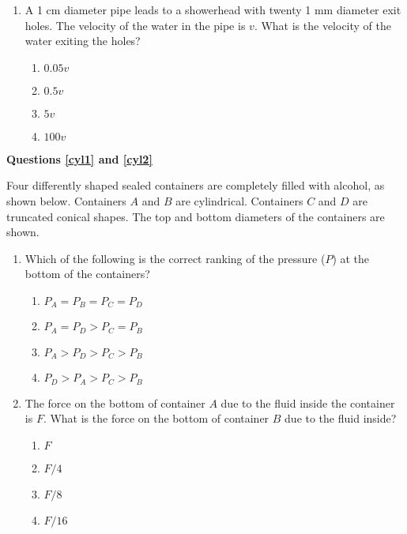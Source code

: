 \documentclass{../../../oss-legalpaper}
\begin{document}
\begin{multicols}{2}
\begin{enumerate}[leftmargin=18pt]
  \item A 1 cm diameter pipe leads to a showerhead with twenty 1 mm diameter
    exit holes. The velocity of the water in the pipe is $v$. What is the
    velocity of the water exiting the holes?
    \begin{enumerate}[nosep,leftmargin=18pt,label=(\Alph*)]
    \item $0.05v$
    \item $0.5v$
    \item $5v$
    \item $100v$
    \end{enumerate}
  \end{enumerate}
  \columnbreak
  
  \textbf{Questions \ref{cyl1} and \ref{cyl2}}

  Four differently shaped sealed containers are completely filled with alcohol,
  as shown below. Containers $A$ and $B$ are cylindrical. Containers $C$ and
  $D$ are truncated conical shapes. The top and bottom diameters of the
  containers are shown.
  \begin{enumerate}[leftmargin=18pt,resume]
    
  \item Which of the following is the correct ranking of the pressure ($P$) at
    the bottom of the containers?
    \label{cyl1}
    \begin{enumerate}[nosep,leftmargin=18pt,label=(\Alph*)]
    \item $P_A = P_B = P_C = P_D$
    \item $P_A = P_D > P_C = P_B$
    \item $P_A > P_D > P_C > P_B$
    \item $P_D > P_A > P_C > P_B$
    \end{enumerate}
    \vspace{.7in}
    
  \item The force on the bottom of container $A$ due to the fluid inside the
    container is $F$. What is the force on the bottom of container $B$ due to
    the fluid inside?
    \label{cyl2}
    \begin{enumerate}[nosep,leftmargin=18pt,label=(\Alph*)]
    \item $F$
    \item $F/4$
    \item $F/8$
    \item $F/16$
    \end{enumerate}


\end{enumerate}
\end{multicols}
\end{document}
